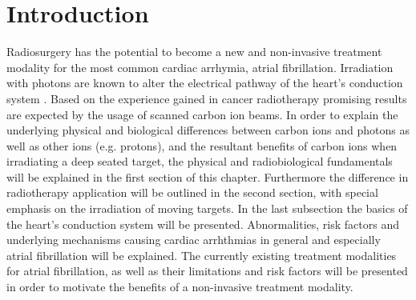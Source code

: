 \documentclass[type=dr, dr=rernat, accentcolor=tud7b,colorbacktitle, bigchapter, openright, twoside, 12pt ]{tudthesis}
\begin{document}
\author{MSc Anna Maria Constantinescu}
\date{\today}
\dateofexam{}{}
\makethesistitle




\dominitoc

\setcounter{tocdepth}{1}
\tableofcontents

\chapter{Introduction}
\minitoc

Radiosurgery has the potential to become a new and non-invasive treatment modality for the most common cardiac arrhymia, atrial fibrillation. 
Irradiation with photons are known to alter the electrical pathway of the heart's conduction system \cite{Sha10}. Based on the 
experience gained in cancer radiotherapy promising results are expected by the usage of scanned carbon ion beams. In order to explain the 
underlying physical and biological differences between carbon ions and photons as well as other ions (e.g. protons), and the resultant benefits 
of carbon ions when irradiating a deep seated target, the physical and radiobiological fundamentals will be explained in the first section of 
this chapter. Furthermore the difference in radiotherapy application will be outlined in the second section, with special emphasis on the 
irradiation of moving targets. In the last subsection the basics of the heart's conduction system will be presented. Abnormalities, risk 
factors and underlying mechanisms causing cardiac arrhthmias in general and especially atrial fibrillation will be explained. The currently 
existing treatment modalities for atrial fibrillation, as well as their limitations and risk factors will be presented in order to motivate 
the benefits of a non-invasive treatment modality. 

\end{document}
